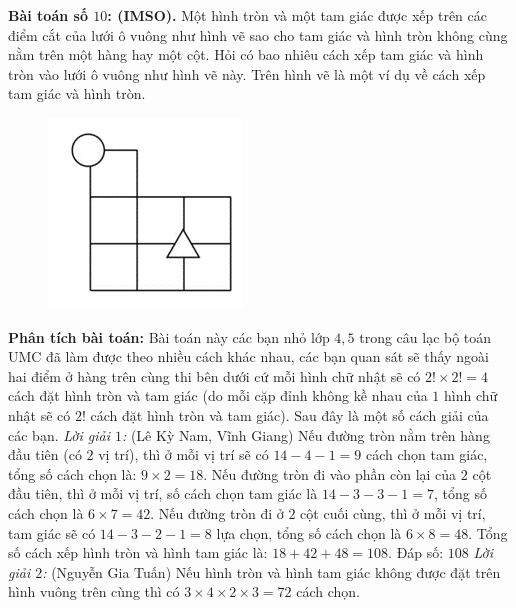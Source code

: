 \begin{multicols}{2}
\begin{figure}[H]
	\end{figure}
	\textbf{\color{toancuabi}Bài toán số $10$: (IMSO).}
	\vskip 0.1cm
	Một hình tròn và một tam giác được xếp trên các điểm cắt của lưới ô vuông như hình vẽ sao cho tam giác và hình tròn không cùng nằm trên một hàng hay một cột.
	\vskip 0.1cm
		Hỏi có bao nhiêu cách xếp tam giác và hình tròn vào lưới ô vuông như hình vẽ này. Trên hình vẽ là một ví dụ về cách xếp tam giác và hình tròn.
		\begin{figure}[H]
			\centering
			\vspace*{-10pt}
			\captionsetup{labelformat=empty, justification=centering}
			\includegraphics[width=0.4\linewidth]{_18}
			\vspace*{-15pt}
		\end{figure}
	\vskip 0.1cm
	\textbf{\color{toancuabi}Phân tích bài toán:} Bài toán này các bạn nhỏ lớp $4,5$ trong câu lạc bộ toán UMC đã làm được theo nhiều cách khác nhau, các bạn quan sát sẽ thấy ngoài hai điểm ở hàng trên cùng thi bên dưới cứ mỗi hình chữ nhật sẽ có $2!\times 2!=4$ cách đặt hình tròn và tam giác (do mỗi cặp đỉnh không kề nhau của $1$ hình chữ nhật sẽ có $2!$ cách đặt hình tròn và tam giác). Sau đây là một số cách giải của các bạn.
	\vskip 0.1cm
	\textit{Lời giải $1$: }(Lê Kỳ Nam, Vĩnh Giang)
	\vskip 0.1cm
	Nếu đường tròn nằm trên hàng đầu tiên (có $2$ vị trí), thì ở mỗi vị trí sẽ có $14 - 4 - 1 = 9$ cách chọn tam giác, tổng số cách chọn là: $9 \times 2 = 18$.
	\vskip 0.1cm
	Nếu đường tròn đi vào phần còn lại của $2$ cột đầu tiên, thì ở mỗi vị trí, số cách chọn tam giác là $14 - 3 - 3 - 1 = 7$, tổng số cách chọn là $6 \times 7 = 42$.
	\vskip 0.1cm
	Nếu đường tròn đi ở $2$ cột cuối cùng, thì ở mỗi vị trí, tam giác sẽ có $14 - 3 - 2 - 1 = 8$ lựa chọn, tổng số cách chọn là $6 \times 8 = 48$.
	\vskip 0.1cm
	Tổng số cách xếp hình tròn và hình tam giác là: $18 + 42 + 48 = 108$.
	\vskip 0.1cm
	Đáp số: $108$
	\vskip 0.1cm
	\textit{Lời giải $2$:} (Nguyễn Gia Tuấn)
	\vskip 0.1cm
	Nếu hình tròn và hình tam giác không được đặt trên hình vuông trên cùng thì có $3 \times 4 \times 2 \times 3 = 72$ cách chọn.

\end{multicols}
